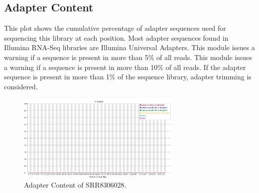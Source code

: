 \documentclass[
  letterpaper,
  DIV=11,
  numbers=noendperiod]{scrreprt}
\begin{document}
\hypertarget{adapter-content}{%
\subsection{Adapter Content}\label{adapter-content}}

This plot shows the cumulative percentage of adapter sequences used for
sequencing this library at each position. Most adapter sequences found
in Illumina RNA-Seq libraries are Illumina Universal Adapters. This
module issues a warning if a sequence is present in more than 5\% of all
reads. This module issues a warning if a sequence is present in more
than 10\% of all reads. If the adapter sequence is present in more than
1\% of the sequence library, adapter trimming is considered.

\begin{figure}

{\centering \includegraphics[width=0.7\textwidth,height=\textheight]{./assets/30_adapter_content.png}

}

\caption{Adapter Content of SRR8306028.}

\end{figure}
\end{document}
